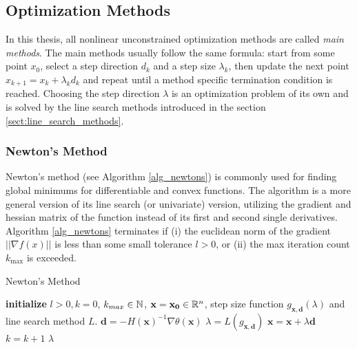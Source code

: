 \documentclass[a4paper,english,titlepage,12pt]{article}
\newcommand{\vect}[1]{\ensuremath{\mathbf{#1}}}
\newcommand{\norm}[1]{\ensuremath\Vert #1 \Vert}
\newcommand{\R}{\ensuremath\mathbb{R}}
\newcommand{\N}{\ensuremath\mathbb{N}}
\begin{document}
\subsection{Optimization Methods}


In this thesis, all nonlinear unconstrained optimization methods are called \emph{main methods}. The main methods usually follow the same formula: start from some point $x_0$, select a step direction $d_k$ and a step size $\lambda_k$, then update the next point $x_{k + 1} = x_k + \lambda_k d_k$ and repeat until a method specific termination condition is reached. Choosing the step direction $\lambda$ is an optimization problem of its own and is solved by the line search methods introduced in the section \ref{sect:line_search_methods}. \cite{book:nonlinear_programming}


\subsubsection{Newton's Method}


Newton's method (see Algorithm \ref{alg_newtons}) is  commonly used for finding global minimums for differentiable and convex functions. The algorithm is a more general version of its line search (or univariate) version, utilizing the gradient and hessian matrix of the function instead of its first and second single derivatives. Algorithm \ref{alg_newtons} terminates if (i) the euclidean norm of the gradient $||\nabla f(x)||$ is less than some small tolerance $l > 0$, or (ii) the max iteration count $k_{\text{max}}$ is exceeded.  

\begin{algorithm}[H]
\caption{Newton's Method}
\label{alg_newtons}
\begin{algorithmic}[1]
\STATE \textbf{initialize} $l > 0, k = 0$, $k_{max} \in \N$, $\vect{x} = \vect{x_0} \in \R^n$, step size function $g_{\vect{x}, \vect{d}}(\lambda)$ and line search method $L$.
\WHILE{$\norm{\nabla \theta(\vect{x})} > l$ \AND $k < k_{max}$}
    \STATE $\vect{d} = -H(\vect{x})^{-1} \nabla \theta(\vect{x})$
    \STATE $\lambda = L(g_{\vect{x}, \vect{d}})$
    \STATE $\vect{x} = \vect{x} + \lambda \vect{d}$
    \STATE $k = k + 1$
\ENDWHILE
\RETURN $\lambda$
\end{algorithmic}
\end{algorithm}
\end{document}
